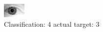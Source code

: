 \begin{figure}[h!]
\begin{center}
\includegraphics[width=0.60\columnwidth]{figures/ID2085_class_4_target_3.png}
\end{center}
\caption{ Classification: 4 actual target: 3}
\label{fig:ID2085_class_4_target_3}
\end{figure}
